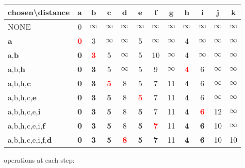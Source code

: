 \documentclass[12pt]{article}
\begin{document}
\begin{table}[H]
	\centering
	\begin{tabular}{|l| c | c | c | c | c | c | c | c | c | c | c |}
		\hline
		chosen\textbackslash distance& a & b & c & d & e & f & g & h & i & j & k \\ \hline
		NONE & 0 & $\infty$ & $\infty$ & $\infty$ & $\infty$ & $\infty$ & $\infty$ & $\infty$ & $\infty$ & $\infty$ & $\infty$ \\ \hline
		
		 \textbf{a} & \textcolor{red}{\textbf{0}} & 3 & $\infty$ & $\infty$ & 5 & $\infty$ & $\infty$ & 4 & $\infty$ & $\infty$ & $\infty$ \\ \hline
		
		a,\textbf{b} & \textbf{0} & \textcolor{red}{\textbf{3}} & 5 & $\infty$ & 5 & 10 & $\infty$ & 4 & $\infty$ & $\infty$ & $\infty$ \\ \hline
		
		a,b,\textbf{h} & \textbf{0} & \textbf{3} & 5 & $\infty$ & 5 & 9 & $\infty$ & \textcolor{red}{\textbf{4}} & 6 & $\infty$ & $\infty$ \\ \hline
		
		a,b,h,\textbf{c} & \textbf{0} & \textbf{3} & \textcolor{red}{\textbf{5}} & 8 & 5 & 7 & 11 & \textbf{4} & 6 & $\infty$ & $\infty$ \\ \hline
		
		a,b,h,c,\textbf{e} & \textbf{0} & \textbf{3} & \textbf{5} & 8 & \textcolor{red}{\textbf{5}} & 7 & 11 & \textbf{4} & 6 & $\infty$ & $\infty$ \\ \hline
		
		a,b,h,c,e,\textbf{i} & \textbf{0} & \textbf{3} & \textbf{5} & 8 & \textbf{5} & 7 & 11 & \textbf{4} & \textcolor{red}{\textbf{6}} & 12 & $\infty$ \\ \hline
		
		a,b,h,c,e,i,\textbf{f} & \textbf{0} & \textbf{3} & \textbf{5} & 8 & \textbf{5} & \textcolor{red}{\textbf{7}} & 11 & \textbf{4} & \textbf{6} & 10 & $\infty$ \\ \hline
		
		a,b,h,c,e,i,f,\textbf{d} & \textbf{0} & \textbf{3} & \textbf{5} & \textcolor{red}{\textbf{8}} & \textbf{5} & \textbf{7} & 11 & \textbf{4} & \textbf{6} & 10 & 10 \\ \hline
		
		
	\end{tabular}
\end{table}
operations at each step:\\
\\
\end{document}
